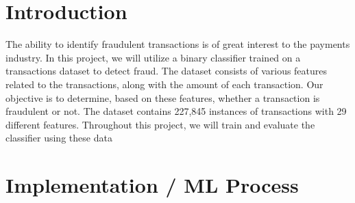 \documentclass[a4, 10 pt, conference]{ieeeconf}  %
\begin{document}

\section{Introduction}
\label{sec:intro}

{\color{black}

\begin{itemize}
	\textbfn The ability to identify fraudulent transactions is of great interest to the payments industry. In this project, we will utilize a binary classifier trained on a transactions dataset to detect fraud. The dataset consists of various features related to the transactions, along with the amount of each transaction. Our objective is to determine, based on these features, whether a transaction is fraudulent or not. The dataset contains 227,845 instances of transactions with 29 different features. Throughout this project, we will train and evaluate the classifier using these data
\end{itemize}
}


\section{Implementation / ML Process}
\label{sec:methods}
\end{document}

